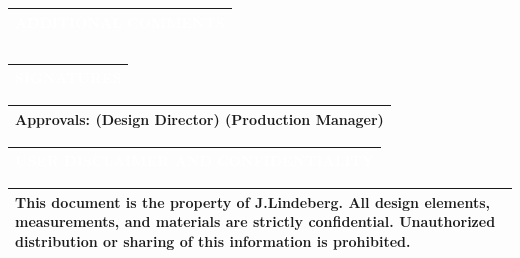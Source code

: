 \documentclass[landscape]{article}
\newcommand{\techsection}[1]{%
\noindent\begin{tabularx}{\textwidth}{|X|}
\hline
\cellcolor{primaryblue}\textcolor{white}{\large\textbf{\faIcon{angle-right} #1}} \\
\hline
\end{tabularx}
\vspace{0.1cm}
}
\begin{document}
\vspace{0.7cm}

\techsection{ADDITIONAL COMMENTS}
\vspace{-0.3cm}
\noindent\begin{tabularx}{\textwidth}{|X|}
\hline
\begin{minipage}[t]{\linewidth}
\vspace{0.3cm}
\large 
\vspace{0.3cm}
\end{minipage} \\
\hline
\end{tabularx}

\vspace{0.7cm}

\techsection{SIGNATURES}
\vspace{-0.3cm}
\noindent\begin{tabularx}{\textwidth}{|X|}
\hline
\begin{minipage}[t]{\linewidth}
\vspace{0.3cm}
\large\textbf{Approvals:} \underline{\hspace{5cm}} (Design Director) \hspace{1cm} \underline{\hspace{5cm}} (Production Manager)
\vspace{0.3cm}
\end{minipage} \\
\hline
\end{tabularx}

\newpage

\techsection{USER DISCLAIMER AND CONFIDENTIALITY}
\vspace{-0.3cm}
\noindent\begin{tabularx}{\textwidth}{|X|}
\hline
\begin{minipage}[t]{\linewidth}
\vspace{0.3cm}
\large This document is the property of J.Lindeberg. All design elements, measurements, and materials are strictly confidential. Unauthorized distribution or sharing of this information is prohibited.
\vspace{0.3cm}
\end{minipage} \\
\hline
\end{tabularx}
\end{document}
